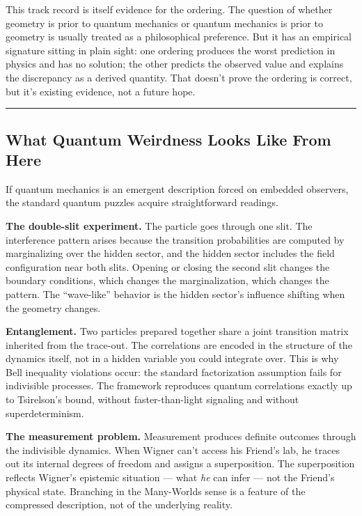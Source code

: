 \documentclass[
]{article}
\begin{document}
This track record is itself evidence for the ordering. The question of
whether geometry is prior to quantum mechanics or quantum mechanics is
prior to geometry is usually treated as a philosophical preference. But
it has an empirical signature sitting in plain sight: one ordering
produces the worst prediction in physics and has no solution; the other
predicts the observed value and explains the discrepancy as a derived
quantity. That doesn't prove the ordering is correct, but it's existing
evidence, not a future hope.

\begin{center}\rule{0.5\linewidth}{0.5pt}\end{center}

\hypertarget{what-quantum-weirdness-looks-like-from-here}{%
\subsection{What Quantum Weirdness Looks Like From
Here}\label{what-quantum-weirdness-looks-like-from-here}}

If quantum mechanics is an emergent description forced on embedded
observers, the standard quantum puzzles acquire straightforward
readings.

\textbf{The double-slit experiment.} The particle goes through one slit.
The interference pattern arises because the transition probabilities are
computed by marginalizing over the hidden sector, and the hidden sector
includes the field configuration near both slits. Opening or closing the
second slit changes the boundary conditions, which changes the
marginalization, which changes the pattern. The ``wave-like'' behavior
is the hidden sector's influence shifting when the geometry changes.

\textbf{Entanglement.} Two particles prepared together share a joint
transition matrix inherited from the trace-out. The correlations are
encoded in the structure of the dynamics itself, not in a hidden
variable you could integrate over. This is why Bell inequality
violations occur: the standard factorization assumption fails for
indivisible processes. The framework reproduces quantum correlations
exactly up to Tsirelson's bound, without faster-than-light signaling and
without superdeterminism.

\textbf{The measurement problem.} Measurement produces definite outcomes
through the indivisible dynamics. When Wigner can't access his Friend's
lab, he traces out its internal degrees of freedom and assigns a
superposition. The superposition reflects Wigner's epistemic situation
--- what \emph{he} can infer --- not the Friend's physical state.
Branching in the Many-Worlds sense is a feature of the compressed
description, not of the underlying reality.
\end{document}
